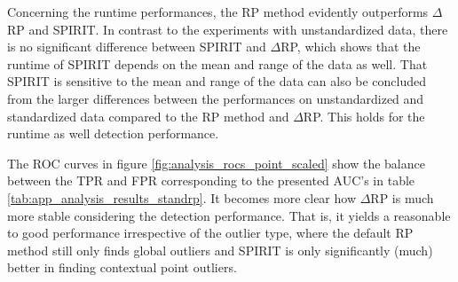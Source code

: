 Concerning the runtime performances, the RP method evidently outperforms $\Delta$RP and SPIRIT. In contrast to the experiments with unstandardized data, there is no significant difference between SPIRIT and $\Delta$RP, which shows that the runtime of SPIRIT depends on the mean and range of the data as well.
That SPIRIT is sensitive to the mean and range of the data can also be concluded from the larger differences between the performances on unstandardized and standardized data compared to the RP method and $\Delta$RP. This holds for the runtime as well detection performance.

The ROC curves in figure \ref{fig:analysis_rocs_point_scaled} show the balance between the TPR and FPR corresponding to the presented AUC's in table \ref{tab:app_analysis_results_standrp}. It becomes more clear how $\Delta$RP is much more stable considering the detection performance. That is, it yields a reasonable to good performance irrespective of the outlier type, where the default RP method still only finds global outliers and SPIRIT is only significantly (much) better in finding contextual point outliers.

